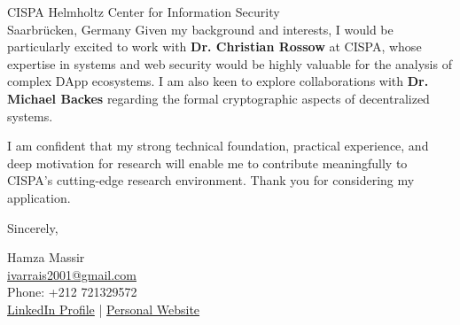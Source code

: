 \documentclass[11pt,a4paper]{letter}
\begin{document}
\begin{letter}{CISPA Helmholtz Center for Information Security\\ Saarbrücken, Germany}
Given my background and interests, I would be particularly excited to work with \textbf{Dr. Christian Rossow} at CISPA, whose expertise in systems and web security would be highly valuable for the analysis of complex DApp ecosystems. I am also keen to explore collaborations with \textbf{Dr. Michael Backes} regarding the formal cryptographic aspects of decentralized systems.

I am confident that my strong technical foundation, practical experience, and deep motivation for research will enable me to contribute meaningfully to CISPA's cutting-edge research environment. Thank you for considering my application.

\closing{Sincerely,}

Hamza Massir\\
\href{mailto:ivarrais2001@gmail.com}{ivarrais2001@gmail.com} \\
Phone: +212 721329572 \\
\href{https://www.linkedin.com/in/ilias-rais/}{LinkedIn Profile} | \href{https://iliasrais.vercel.app}{Personal Website}

\end{letter}
\end{document}
